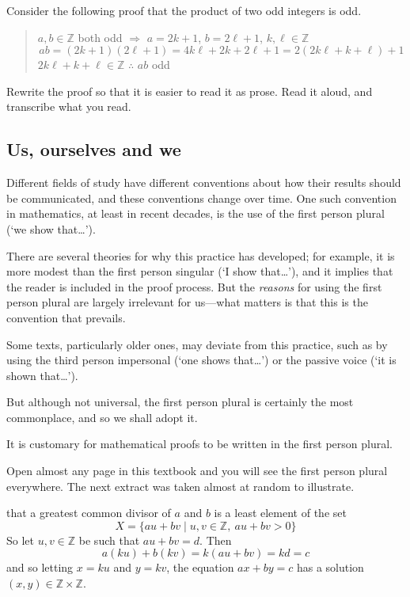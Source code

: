 \begin{exercise}
Consider the following proof that the product of two odd integers is odd.
\begin{quote}
$a,b \in \mathbb{Z}$ both odd $\Rightarrow$ $a=2k+1$, $b=2\ell+1$, $k,\ell \in \mathbb{Z}$
\[ ab = (2k+1)(2\ell+1) = 4k\ell+2k+2\ell+1 = 2(2k\ell+k+\ell)+1\]
$2k\ell + k + \ell \in \mathbb{Z}$ $\therefore$ $ab$ odd
\end{quote}
Rewrite the proof so that it is easier to read it as prose. Read it aloud, and transcribe what you read.
\end{exercise}

\subsection*{Us, ourselves and we}

Different fields of study have different conventions about how their results should be communicated, and these conventions change over time. One such convention in mathematics, at least in recent decades, is the use of the first person plural (`we show that\dots{}').

There are several theories for why this practice has developed; for example, it is more modest than the first person singular (`I show that\dots{}'), and it implies that the reader is included in the proof process. But the \textit{reasons} for using the first person plural are largely irrelevant for us---what matters is that this is the convention that prevails.

Some texts, particularly older ones, may deviate from this practice, such as by using the third person impersonal (`one shows that\dots{}') or the passive voice (`it is shown that\dots{}').

But although not universal, the first person plural is certainly the most commonplace, and so we shall adopt it.

\begin{writingprinciple}
\label{wpFirstPersonPlural}
It is customary for mathematical proofs to be written in the first person plural.
\end{writingprinciple}

Open almost any page in this textbook and you will see the first person plural everywhere. The next extract was taken almost at random to illustrate.

\begin{extract}
  that a greatest common divisor of $a$ and $b$ is a least element of the set
\[ X = \{ au+bv \mid u,v \in \mathbb{Z},\ au+bv > 0 \} \]
So let $u,v \in \mathbb{Z}$ be such that $au+bv=d$. Then
\[ a(ku) + b(kv) = k(au+bv) = kd = c \]
and so letting $x=ku$ and $y=kv$,  the equation $ax+by=c$ has a solution $(x,y) \in \mathbb{Z} \times \mathbb{Z}$.
\end{extract}

